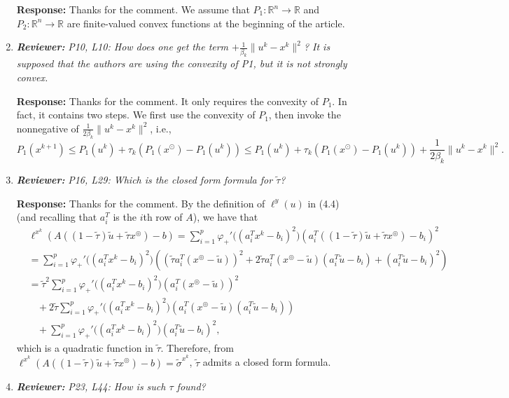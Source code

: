 \documentclass{article}
\def\R{\mathbb{R}}
\begin{document}
\begin{enumerate}
	\textbf{Response:} Thanks for the comment. We assume that $P_1:\R^n\rightarrow\R$ and $P_2:\R^n\rightarrow\R$ are finite-valued convex functions at the beginning of the article.

	\item  \textit{\textbf{Reviewer:}} \textit{P10, L10: How does one get the term $+\frac{1}{\beta_k}\|u^k - x^k\|^2$? It is supposed that the authors are using the convexity of P1, but it is not strongly convex.}
	
	\textbf{Response:} Thanks for the comment. It only requires the convexity of $P_1$. In fact, it contains two steps. We first use the convexity of $P_1$, then invoke the nonnegative of $\frac{1}{2\beta_k}\|u^k - x^k\|^2$, i.e.,
\[
P_1(x^{k+1})\leq P_1(u^k) + \tau_k(P_1(x^\odot) - P_1(u^k))\leq P_1(u^k) + \tau_k(P_1(x^\odot) - P_1(u^k)) + \frac{1}{2\beta_k}\|u^k - x^k\|^2.
\]

	\item  \textit{\textbf{Reviewer:}} \textit{P16, L29: Which is the closed form formula for $\tilde{\tau}$?}
	
	\textbf{Response:} Thanks for the comment. By the definition of $\ell^{y}(u)$ in (4.4) (and recalling that $a_i^T$ is the $i$th row of $A$), we have that
\begin{equation*}
\begin{aligned}
&\ell^{x^k}(A((1-\widetilde\tau)\widetilde u + \widetilde\tau x^\circledcirc) - b) = \sum_{i=1}^p\varphi_+'\big((a_i^T x^k - b_i)^2\big)(a_i^T((1-\widetilde\tau)\widetilde u + \widetilde\tau x^\circledcirc) - b_i)^2\\
& = \sum_{i=1}^p\varphi_+'\big((a_i^T x^k - b_i)^2\big)((\widetilde\tau a_i^T(x^\circledcirc - \widetilde u))^2 + 2\widetilde\tau a_i^T(x^\circledcirc - \widetilde u)(a_i^T\widetilde u - b_i) + (a_i^T\widetilde u - b_i)^2)\\
&= \widetilde\tau^2\sum_{i=1}^p\varphi_+'\big((a_i^T x^k - b_i)^2\big)(a_i^T(x^\circledcirc - \widetilde u))^2 \\
&~~~~+ 2\widetilde\tau \sum_{i=1}^p\varphi_+'\big((a_i^T x^k - b_i)^2\big)(a_i^T(x^\circledcirc - \widetilde u)(a_i^T\widetilde u - b_i)) \\
&~~~~+ \sum_{i=1}^p\varphi_+'\big((a_i^T x^k - b_i)^2\big)(a_i^T\widetilde u - b_i)^2,
\end{aligned}
\end{equation*}
which is a quadratic function in $\widetilde\tau$. Therefore, from $\ell^{x^k}(A((1-\widetilde\tau)\widetilde u + \widetilde\tau x^\circledcirc) - b) = \tilde{\sigma}^{x^k}$, $\widetilde\tau$ admits a closed form formula.
	\item  \textit{\textbf{Reviewer:}} \textit{P23, L44: How is such $\tau$ found?}
	

\end{enumerate}
\end{document}
